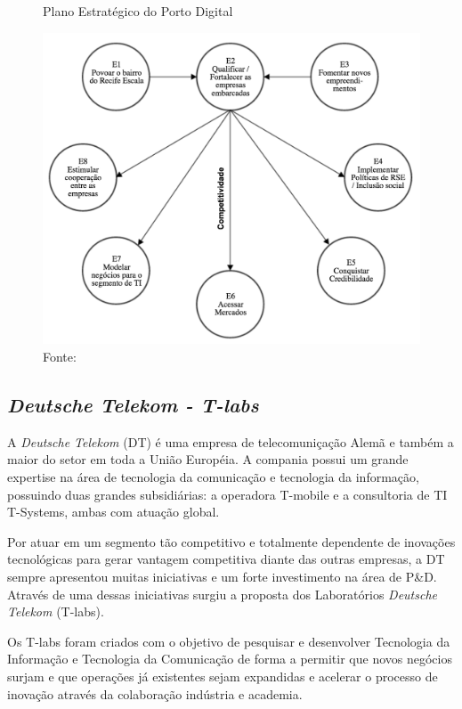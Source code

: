 \begin{figure}
\caption{Plano Estratégico do Porto Digital}
\centerline{\includegraphics[scale=0.5]{img/estrategiasPD}}
\label{fig:estrategiasPD}
\caption* {Fonte: }
\end{figure}

\subsection{\textit{Deutsche Telekom - T-labs}}

A \textit{Deutsche Telekom} (DT) é uma empresa de telecomuniçação Alemã e também a maior do setor em toda a União Européia. A compania possui um grande expertise na área de tecnologia da comunicação e tecnologia da informação, possuindo duas grandes subsidiárias: a operadora T-mobile e a consultoria de TI T-Systems, ambas com atuação global.

Por atuar em um segmento tão competitivo e totalmente dependente de inovações tecnológicas para gerar vantagem competitiva diante das outras empresas, a DT sempre apresentou muitas iniciativas e um forte investimento na área de P\&D. Através de uma dessas iniciativas surgiu a proposta dos Laboratórios \textit{Deutsche Telekom} (T-labs).

Os T-labs foram criados com o objetivo de pesquisar e desenvolver Tecnologia da Informação e Tecnologia da Comunicação de forma a permitir que novos negócios surjam e que operações já existentes sejam expandidas e acelerar o processo de inovação através da colaboração indústria e academia. \cite{dtlabs}

